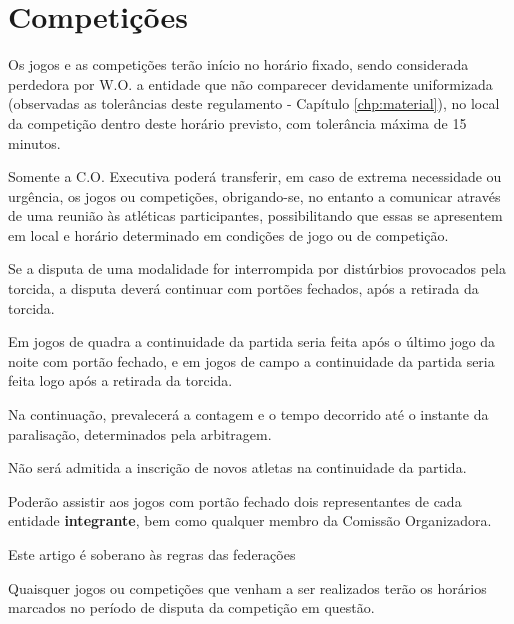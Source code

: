 {\let\clearpage\relax \chapter{Competições}}

\begin{article}
	Os jogos e as competições terão início no horário fixado, sendo considerada perdedora por W.O. a entidade que não comparecer devidamente uniformizada (observadas as tolerâncias deste regulamento - Capítulo \ref{chp:material}), no local da competição dentro deste horário previsto, com tolerância máxima de 15 minutos.
\end{article}

\begin{article}
	Somente a C.O. Executiva poderá transferir, em caso de extrema necessidade ou urgência, os jogos ou competições, obrigando-se, no entanto a comunicar através de uma reunião às atléticas participantes, possibilitando que essas se apresentem em local e horário determinado em condições de jogo ou de competição.
\end{article}

\begin{article}
	\label{art:jogos.interromp}
	Se a disputa de uma modalidade for interrompida por distúrbios provocados pela torcida, a disputa deverá continuar com portões fechados, após a retirada da torcida.

	\begin{xparagraph}
		Em jogos de quadra a continuidade da partida seria feita após o último jogo da noite com portão fechado, e em jogos de campo a continuidade da partida seria feita logo após a retirada da torcida.
	\end{xparagraph}

	\begin{xparagraph}
		Na continuação, prevalecerá a contagem e o tempo decorrido até o instante da paralisação, determinados pela arbitragem.
	\end{xparagraph}

	\begin{xparagraph}
		Não será admitida a inscrição de novos atletas na continuidade da partida.
	\end{xparagraph}

	\begin{xparagraph}
		Poderão assistir aos jogos com portão fechado dois representantes de cada entidade \textbf{integrante}, bem como qualquer membro da Comissão Organizadora.
	\end{xparagraph}

	\begin{xparagraph}
		Este artigo é soberano às regras das federações
	\end{xparagraph}
\end{article}

\begin{article}
	Quaisquer jogos ou competições que venham a ser realizados terão os horários marcados no período de disputa da competição em questão.
\end{article}
